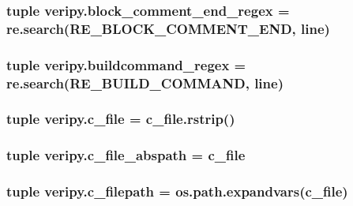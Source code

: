 \hypertarget{namespaceveripy_aa1db3e87be026e6684d07c823dfa6e99}{
\subsubsection[{block\-\_\-comment\-\_\-end\-\_\-regex}]{\setlength{\rightskip}{0pt plus 5cm}tuple veripy.\-block\-\_\-comment\-\_\-end\-\_\-regex = re.\-search(R\-E\-\_\-\-B\-L\-O\-C\-K\-\_\-\-C\-O\-M\-M\-E\-N\-T\-\_\-\-E\-N\-D, {\bf line})}}\label{namespaceveripy_aa1db3e87be026e6684d07c823dfa6e99}
\hypertarget{namespaceveripy_a7f1757c2a06b63c4d45e1943eebdce18}{
\subsubsection[{buildcommand\-\_\-regex}]{\setlength{\rightskip}{0pt plus 5cm}tuple veripy.\-buildcommand\-\_\-regex = re.\-search(R\-E\-\_\-\-B\-U\-I\-L\-D\-\_\-\-C\-O\-M\-M\-A\-N\-D, {\bf line})}}\label{namespaceveripy_a7f1757c2a06b63c4d45e1943eebdce18}
\hypertarget{namespaceveripy_aeec698b4635f08372de56311378d1526}{
\subsubsection[{c\-\_\-file}]{\setlength{\rightskip}{0pt plus 5cm}tuple veripy.\-c\-\_\-file = c\-\_\-file.\-rstrip()}}\label{namespaceveripy_aeec698b4635f08372de56311378d1526}
\hypertarget{namespaceveripy_a53d32cc2c5a71562b7e9d2414bca5ccf}{
\subsubsection[{c\-\_\-file\-\_\-abspath}]{\setlength{\rightskip}{0pt plus 5cm}tuple veripy.\-c\-\_\-file\-\_\-abspath = {\bf c\-\_\-file}}}\label{namespaceveripy_a53d32cc2c5a71562b7e9d2414bca5ccf}
\hypertarget{namespaceveripy_af2b6d56f745ddde0e41f187cb2bfdf6b}{
\subsubsection[{c\-\_\-filepath}]{\setlength{\rightskip}{0pt plus 5cm}tuple veripy.\-c\-\_\-filepath = os.\-path.\-expandvars({\bf c\-\_\-file})}}\label{namespaceveripy_af2b6d56f745ddde0e41f187cb2bfdf6b}
